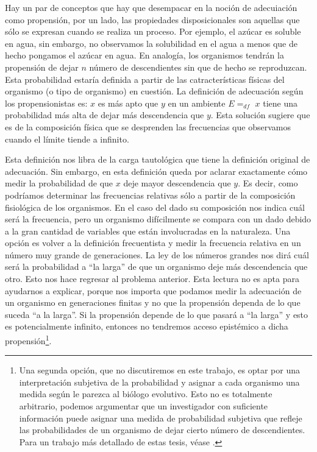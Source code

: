 Hay un par de conceptos que hay que desempacar en la noción de adecuiación como propensión, por un lado, las propiedades disposicionales son aquellas que sólo se expresan cuando se realiza un proceso. Por ejemplo, el azúcar es soluble en agua, sin embargo, no observamos la solubilidad en el agua a menos que de hecho pongamos el azúcar en agua. En analogía, los organismos tendrán la propensión de dejar $n$ número de descendientes sin que de hecho se reproduzcan. Esta probabilidad estaría definida a partir de las catracterísticas físicas del organismo (o tipo de organismo) en cuestión. La definición de adecuación según los propensionistas es: $x$ es más apto que $y$ en un ambiente $E =_{df}$ $x$ tiene una probabilidad más alta de dejar más descendencia que $y$. Esta solución sugiere que es de la composición física que se desprenden las frecuencias que observamos cuando el límite tiende a infinito.

Esta definición nos libra de la carga tautológica que tiene la definición original de adecuación. Sin embargo, en esta definición queda por aclarar exactamente cómo medir la probabilidad de que $x$ deje mayor descendencia que $y$. Es decir, como podríamos determinar las frecuencias relativas sólo a partir de la composición fisiológica de los organismos. En el caso del dado su composición nos indica cuál será la frecuencia, pero un organismo difícilmente se compara con un dado debido a la gran cantidad de variables que están involucradas en la naturaleza. Una opción es volver a la definición frecuentista y medir la frecuencia relativa en un número muy grande de generaciones. La ley de los números grandes nos dirá cuál será la probabilidad a ``la larga'' de que un organismo deje más descendencia que otro. Esto nos hace regresar al problema anterior. Esta lectura no es apta para ayudarnos a explicar, porque nos importa que podamos medir la adecuación de un organismo en generaciones finitas y no que la propensión dependa de lo que suceda ``a la larga''. Si la propensión depende de lo que pasará a ``la larga'' y esto es potencialmente infinito, entonces no tendremos acceso epistémico a dicha propensión\footnote{Una segunda opción, que no discutiremos en este trabajo, es optar por una interpretación subjetiva de la probabilidad y asignar a cada organismo una medida según le parezca al biólogo evolutivo. Esto no es totalmente arbitrario, podemos argumentar que un investigador con suficiente información puede asignar una medida de probabilidad subjetiva que refleje las probabilidades de un organismo de dejar cierto número de descendientes. Para un trabajo más detallado de estas tesis, véase \cite{Suarez2021}.}.

